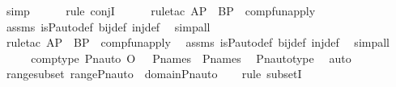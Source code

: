 \begin{isabellebody}
\ simp\isanewline
\ \ \ \ \isamarkupfalse%
\ {\isacharparenleft}{\kern0pt}rule\ conjI{\isacharparenright}{\kern0pt}\isanewline
\ \ \ \ \isamarkupfalse%
\ {\isacharparenleft}{\kern0pt}rule{\isacharunderscore}{\kern0pt}tac\ A{\isacharequal}{\kern0pt}P\ \ B{\isacharequal}{\kern0pt}P\ \ comp{\isacharunderscore}{\kern0pt}fun{\isacharunderscore}{\kern0pt}apply{\isacharparenright}{\kern0pt}\ \isamarkupfalse%
\ assms\ is{\isacharunderscore}{\kern0pt}P{\isacharunderscore}{\kern0pt}auto{\isacharunderscore}{\kern0pt}def\ bij{\isacharunderscore}{\kern0pt}def\ inj{\isacharunderscore}{\kern0pt}def\ \isamarkupfalse%
\ simp{\isacharunderscore}{\kern0pt}all\ \isanewline
\ \ \ \ \isamarkupfalse%
\ {\isacharparenleft}{\kern0pt}rule{\isacharunderscore}{\kern0pt}tac\ A{\isacharequal}{\kern0pt}P\ \ B{\isacharequal}{\kern0pt}P\ \ comp{\isacharunderscore}{\kern0pt}fun{\isacharunderscore}{\kern0pt}apply{\isacharparenright}{\kern0pt}\ \isamarkupfalse%
\ assms\ is{\isacharunderscore}{\kern0pt}P{\isacharunderscore}{\kern0pt}auto{\isacharunderscore}{\kern0pt}def\ bij{\isacharunderscore}{\kern0pt}def\ inj{\isacharunderscore}{\kern0pt}def\ \isamarkupfalse%
\ simp{\isacharunderscore}{\kern0pt}all\ \isamarkupfalse%
\ \isanewline
\ \ \isamarkupfalse%
\ \isamarkupfalse%
\ comp{\isacharunderscore}{\kern0pt}type{\isacharcolon}{\kern0pt}\ {\isachardoublequoteopen}Pn{\isacharunderscore}{\kern0pt}auto{\isacharparenleft}{\kern0pt}{\isasympi}\ O\ {\isasymtau}{\isacharparenright}{\kern0pt}\ {\isasymin}\ P{\isacharunderscore}{\kern0pt}names\ {\isasymrightarrow}\ P{\isacharunderscore}{\kern0pt}names{\isachardoublequoteclose}\ \isamarkupfalse%
\ Pn{\isacharunderscore}{\kern0pt}auto{\isacharunderscore}{\kern0pt}type\ \isamarkupfalse%
\ auto\ \isanewline
\isanewline
\ \ \isamarkupfalse%
\ range{\isacharunderscore}{\kern0pt}subset{\isacharcolon}{\kern0pt}\ {\isachardoublequoteopen}range{\isacharparenleft}{\kern0pt}Pn{\isacharunderscore}{\kern0pt}auto{\isacharparenleft}{\kern0pt}{\isasymtau}{\isacharparenright}{\kern0pt}{\isacharparenright}{\kern0pt}\ {\isasymsubseteq}\ domain{\isacharparenleft}{\kern0pt}Pn{\isacharunderscore}{\kern0pt}auto{\isacharparenleft}{\kern0pt}{\isasympi}{\isacharparenright}{\kern0pt}{\isacharparenright}{\kern0pt}{\isachardoublequoteclose}\ \isanewline
\ \ \isamarkupfalse%
{\isacharparenleft}{\kern0pt}rule\ subsetI{\isacharparenright}{\kern0pt}\isanewline

\end{isabellebody}
